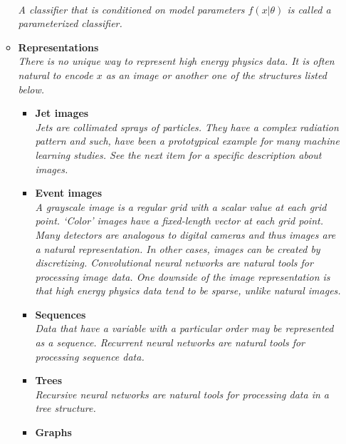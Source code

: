 \documentclass[12pt,letterpaper]{article}
\begin{document}
\begin{itemize}
\begin{itemize}
			\\\textit{A classifier that is conditioned on model parameters $f(x|\theta)$ is called a parameterized classifier.}
		\item \textbf{Representations}
			\\\textit{There is no unique way to represent high energy physics data.  It is often natural to encode $x$ as an image or another one of the structures listed below.}
			\begin{itemize}
				\item \textbf{Jet images}~\cite{Pumplin:1991kc,Cogan:2014oua,Almeida:2015jua,deOliveira:2015xxd,ATL-PHYS-PUB-2017-017,Lin:2018cin,Komiske:2018oaa,Barnard:2016qma,Komiske:2016rsd,Kasieczka:2017nvn,Macaluso:2018tck,li2020reconstructing,li2020attention,Lee:2019cad,collado2021learning,Du:2020pmp}
				\\\textit{Jets are collimated sprays of particles.  They have a complex radiation pattern and such, have been a prototypical example for many machine learning studies.  See the next item for a specific description about images.}
				\item \textbf{Event images}~\cite{Nguyen:2018ugw,ATL-PHYS-PUB-2019-028,Lin:2018cin,Andrews:2018nwy,Chung:2020ysf,Du:2019civ}
				\\\textit{A grayscale image is a regular grid with a scalar value at each grid point.  `Color' images have a fixed-length vector at each grid point.  Many detectors are analogous to digital cameras and thus images are a natural representation.  In other cases, images can be created by discretizing.   Convolutional neural networks are natural tools for processing image data.  One downside of the image representation is that high energy physics data tend to be sparse, unlike natural images.}
				\item \textbf{Sequences}~\cite{Guest:2016iqz,Nguyen:2018ugw,Bols:2020bkb,goto2021development,deLima:2021fwm}
				\\\textit{Data that have a variable with a particular order may be represented as a sequence.  Recurrent neural networks are natural tools for processing sequence data. }
				\item \textbf{Trees}~\cite{Louppe:2017ipp,Cheng:2017rdo}
				\\\textit{Recursive neural networks are natural tools for processing data in a tree structure.}
				\item \textbf{Graphs}~\cite{Henrion:DLPS2017,Ju:2020xty,Abdughani:2018wrw,Martinez:2018fwc,Ren:2019xhp,Moreno:2019bmu,Qasim:2019otl,Chakraborty:2019imr,Chakraborty:2020yfc,1797439,1801423,1808887,Iiyama:2020wap,1811770,Choma:2020cry,alonsomonsalve2020graph,guo2020boosted,Heintz:2020soy,Verma:2020gnq,Dreyer:2020brq,Qian:2021vnh,Pata:2021oez,Biscarat:2021dlj,Rossi:2021tjf,Hewes:2021heg,Thais:2021qcb,Dezoort:2021kfk,Verma:2021ceh,Hariri:2021clz,Belavin:2021bxb}

\end{itemize}
\end{itemize}
\end{itemize}
\end{document}
